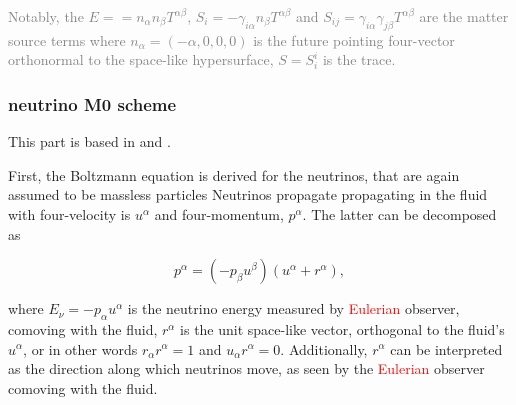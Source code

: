 \documentclass[11pt,a4paper,headinclude=true,DIV=14,BCOR=8mm,chapterprefix,listof=totoc,twoside,openright,abstracton]{scrbook}
\newcommand{\red}[1]{\textcolor{red}{#1}}
\newcommand{\gray}[1]{\textcolor{gray}{#1}}
\begin{document}





\gray{
    Notably, the $E == n_{\alpha}n_{\beta}T^{\alpha\beta}$, 
    $S_i = -\gamma_{i\alpha}n_{\beta}T^{\alpha\beta}$ and $S_{ij} = \gamma_{i\alpha}\gamma_{j\beta}T^{\alpha\beta}$ are the matter source terms where $n_{\alpha}=(-\alpha, 0, 0, 0)$ is the future pointing four-vector orthonormal to the space-like hypersurface, $S=S_{i}^{i}$ is the trace.
}

\subsubsection{neutrino M0 scheme}

This part is based in \cite{Radice:2016dwd} and \cite{Radice:2018pdn}.

First, the Boltzmann equation is derived for the neutrinos, that are again
assumed to be massless particles
Neutrinos propagate propagating in the fluid
with four-velocity is $u^{\alpha}$ and four-momentum, $p^{\alpha}$.
The latter can be decomposed as \cite{Thorne:1981}

\begin{equation}
    p^{\alpha} = (-p_{\beta}u^{\beta})(u^{\alpha} + r^{\alpha}),
\end{equation}

where $E_{\nu}=-p_{\alpha}u^{\alpha}$ is the neutrino energy measured by \red{Eulerian} observer,
comoving with the fluid, $r^{\alpha}$ is the unit space-like vector, orthogonal to the 
fluid's $u^{\alpha}$, or in other words $r_{\alpha}r^{\alpha}=1$ and $u_{\alpha}r^{\alpha}=0$.
Additionally, $r^{\alpha}$ can be interpreted as the direction along which neutrinos move,
as seen by the \red{Eulerian} observer comoving with the fluid.
\end{document}
